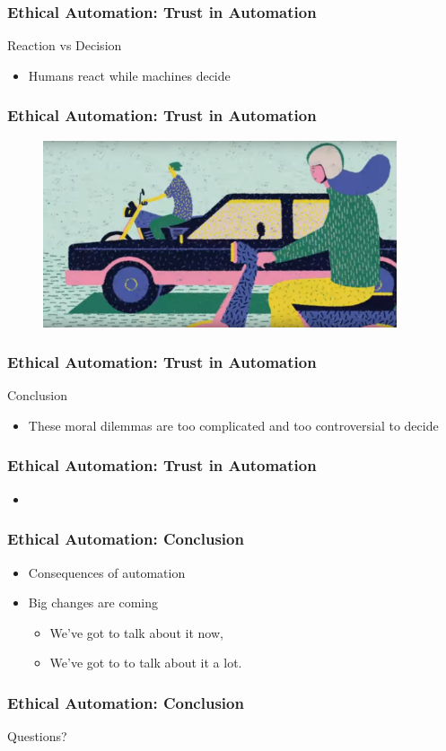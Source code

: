 \begin{frame}
  \frametitle{ Ethical Automation: Trust in Automation}
  {\Large Reaction vs Decision}
  \begin{itemize}
  \item Humans react while machines decide
  \end{itemize}
\end{frame}


\begin{frame}
  \frametitle{ Ethical Automation: Trust in Automation}
  \begin{figure}[bht]
    \centering
    \includegraphics[width=4.1in]{diagrams/image01}
    \caption{}
    \label{fig:-deg}
  \end{figure}
\end{frame}


\begin{frame}
  \frametitle{ Ethical Automation: Trust in Automation}
  {\Large Conclusion}
  \begin{itemize}
  \item These moral dilemmas are too complicated and too controversial to decide
  \end{itemize}
\end{frame}


\begin{frame}
  \frametitle{ Ethical Automation: Trust in Automation}
  \begin{itemize}
  \item
  \end{itemize}
\end{frame}


\begin{frame}
  \frametitle{ Ethical Automation: Conclusion}
  \begin{itemize}
  \item Consequences of automation
  \item Big changes are coming
    \begin{itemize}
    \item We've got to talk about it now,
    \item We've got to to talk about it a lot.
    \end{itemize}
  \end{itemize}
\end{frame}


\begin{frame}
  \frametitle{ Ethical Automation: Conclusion}
  \Large Questions?
\end{frame}
